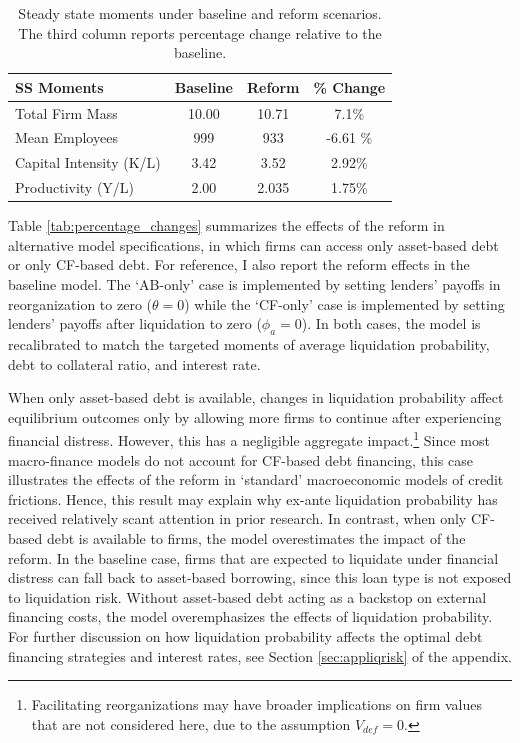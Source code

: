 \documentclass[12pt]{article}
\begin{document}
\begin{table}[H]
    \centering
     \begin{tabular}{lccc}
     \textbf{SS Moments} & \textbf{Baseline} & \textbf{Reform} & \textbf{\% Change} \\ 
          \midrule
     Total Firm Mass & 10.00 & 10.71 & 7.1\% \\ 
     Mean Employees & 999 & 933 & -6.61 \% \\
     Capital Intensity (K/L) & 3.42 & 3.52 & 2.92\% \\ 
     Productivity (Y/L) & 2.00 & 2.035 & 1.75\% \\
    \bottomrule
    \end{tabular}
    \caption{\small Steady state moments under baseline and reform scenarios. The third column reports percentage change relative to the baseline.}
    \label{tab:SSvalues_GE}
\end{table}

\noindent Table \ref{tab:percentage_changes} summarizes the effects of the reform in alternative model specifications, in which firms can access only asset-based debt or only CF-based debt. For reference, I also report the reform effects in the baseline model. The `AB-only' case is implemented by setting lenders' payoffs in reorganization to zero ($\theta = 0$) while the `CF-only' case is implemented by setting lenders' payoffs after liquidation to zero ($\phi_a = 0$). In both cases, the model is recalibrated to match the targeted moments of average liquidation probability, debt to collateral ratio, and interest rate.

When only asset-based debt is available, changes in liquidation probability affect equilibrium outcomes only by allowing more firms to continue after experiencing financial distress. However, this has a negligible aggregate impact.\footnote{Facilitating reorganizations may have broader implications on firm values that are not considered here, due to the assumption $V_{def} = 0$.} Since most macro-finance models do not account for CF-based debt financing, this case illustrates the effects of the reform in `standard' macroeconomic models of credit frictions. Hence, this result may explain why ex-ante liquidation probability has received relatively scant attention in prior research. In contrast, when only CF-based debt is available to firms, the model overestimates the impact of the reform. In the baseline case, firms that are expected to liquidate under financial distress can fall back to asset-based borrowing, since this loan type is not exposed to liquidation risk. Without asset-based debt acting as a backstop on external financing costs, the model overemphasizes the effects of liquidation probability. For further discussion on how liquidation probability affects the optimal debt financing strategies and interest rates, see Section \ref{sec:appliqrisk} of the appendix.
\end{document}
